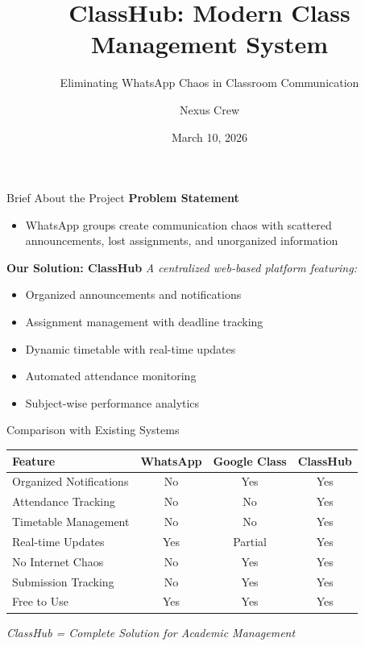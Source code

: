 \documentclass{beamer}
\title[ClassHub]{ClassHub: Modern Class Management System }
\subtitle{Eliminating WhatsApp Chaos in Classroom Communication }
\author[Nexus Crew]{Nexus Crew }
\institute[CSE]{Computer Science \& Engineering \\ 2nd Year Mini Project }
\date{March 10, 2026 }
\begin{document}
\begin{frame}
    \titlepage
\end{frame}

\begin{frame}{Brief About the Project}
    \textbf{Problem Statement }
    \begin{itemize}
        \item WhatsApp groups create communication chaos with scattered announcements, lost assignments, and unorganized information
    \end{itemize}
    
    \vspace{0.3cm}
    \textbf{Our Solution: ClassHub }
    \textit{A centralized web-based platform featuring: }
    \begin{itemize}
        \item Organized announcements and notifications 
        \item Assignment management with deadline tracking 
        \item Dynamic timetable with real-time updates 
        \item Automated attendance monitoring 
        \item Subject-wise performance analytics 
    \end{itemize}
\end{frame}

\begin{frame}{Comparison with Existing Systems }
    \small
    \begin{table}
    \begin{tabular}{|l|c|c|c|}
    \hline
    \textbf{Feature} & \textbf{WhatsApp} & \textbf{Google Class} & \textbf{ClassHub} \\ \hline
    Organized Notifications & No & Yes & Yes \\ \hline
    Attendance Tracking & No & No & Yes \\ \hline
    Timetable Management & No & No & Yes \\ \hline
    Real-time Updates & Yes & Partial & Yes \\ \hline
    No Internet Chaos & No & Yes & Yes \\ \hline
    Submission Tracking & No & Yes & Yes \\ \hline
    Free to Use & Yes & Yes & Yes \\ \hline
    \end{tabular}
    \end{table}
    \centering \textit{ClassHub = Complete Solution for Academic Management }
\end{frame}
\end{document}
